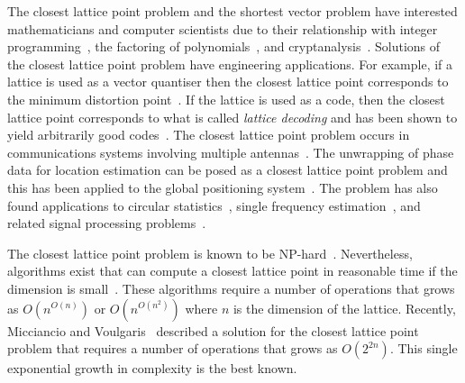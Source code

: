 \documentclass[final,leqno]{siamltex}
\begin{document}
The closest lattice point problem and the shortest vector problem have interested mathematicians and computer scientists due to their relationship with integer programming~\cite{Lenstra_integerprogramming1983,Kannan1987_fast_general_np,Babai1986}, the factoring of polynomials~\cite{Lenstra1982}, and cryptanalysis~\cite{Joux_toolbox_cryptanal1998,NyguyenStern_two_faces_crypto,Micciancio_lattice_based_post_quantum_crypto}.  
Solutions of the closest lattice point problem have engineering applications.  For example, if a lattice is used as a vector quantiser then the closest lattice point corresponds to the minimum distortion point~\cite{Conway1983VoronoiCodes,Conway1982VoronoiRegions,Conway1982FastQuantDec}.  If the lattice is used as a code, then the closest lattice point corresponds to what is called \emph{lattice decoding} and has been shown to yield arbitrarily good codes~\cite{Erex2004_lattice_decoding,Erez2005}.  The closest lattice point problem occurs in communications systems involving multiple antennas~\cite{Ryan2008,Wubben_2011}.  The unwrapping of phase data for location estimation can be posed as a closest lattice point problem and this has been applied to the global positioning system~\cite{Teunissen_GPS_1995,Hassibi_GPS_1998}.  The problem has also found applications to circular statistics~\cite{McKilliam_mean_dir_est_sq_arc_length2010}, single frequency estimation~\cite{McKilliamFrequencyEstimationByPhaseUnwrapping2009}, and related signal processing problems~\cite{McKilliam2007,Clarkson2007,McKilliam2009IndentifiabliltyAliasingPolyphase,Quinn_sparse_noisy_SSP_2012}.

The closest lattice point problem is known to be NP-hard~\cite{micciancio_hardness_2001, Dinur2003_approximating_CVP_NP_hard,Regev_2004_inappox_lattice_with_preprocessing,feige_inapproximability_2004,Jalden2005_sphere_decoding_complexity}.  Nevertheless, algorithms exist that can compute a closest lattice point in reasonable time if the dimension is small~\cite{Pohst_sphere_decoder_1981,Kannan1987_fast_general_np,Agrell2002}.  These algorithms require a number of operations that grows as $O(n^{O(n)})$ or $O(n^{O(n^2)})$ where $n$ is the dimension of the lattice.  Recently, Micciancio and Voulgaris~\cite{MicciancioVoulgaris_deterministic_jv_2013} described a solution for the closest lattice point problem that requires a number of operations that grows as $O(2^{2n})$.  This single exponential growth in complexity is the best known. 
\end{document}
